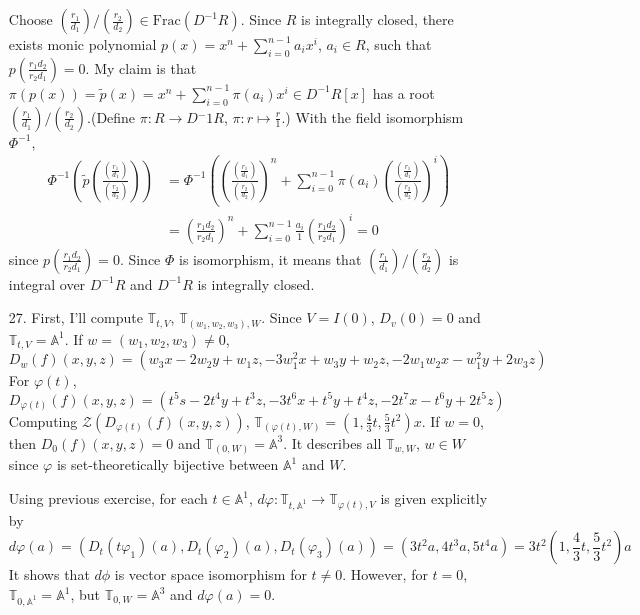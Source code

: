 \documentclass[12pt]{article}
\newcommand{\Z}{\mathcal{Z}}
\begin{document}
\begin{enumerate}
Choose $\left(\frac{r_1}{d_1}\right)/\left(\frac{r_2}{d_2}\right)\in \text{Frac}(D^{-1}R)$. Since $R$ is integrally closed, there exists monic polynomial $p(x)=x^n+\sum\limits_{i=0}^{n-1}a_i x^i$, $a_i\in R$, such that $p\left(\frac{r_1d_2}{r_2d_1}\right)=0$. My claim is that $\pi(p(x))=\tilde{p}(x)=x^n+\sum\limits_{i=0}^{n-1}\pi(a_i) x^i\in D^{-1}R[x]$ has a root $\left(\frac{r_1}{d_1}\right)/\left(\frac{r_2}{d_2}\right)$.(Define $\pi:R\rightarrow D{^-1}R$, $\pi:r\mapsto \frac{r}{1}$.) With the field isomorphism $\Phi^{-1}$,
\begin{equation*}
\begin{split}
\Phi^{-1}\left(\tilde{p}\left(\frac{\left(\frac{r_1}{d_1}\right)}{\left(\frac{r_2}{d_2}\right)}\right)\right)&=\Phi^{-1}\left(\left(\frac{\left(\frac{r_1}{d_1}\right)}{\left(\frac{r_2}{d_2}\right)}\right)^n+\sum\limits_{i=0}^{n-1} \pi(a_i)\left(\frac{\left(\frac{r_1}{d_1}\right)}{\left(\frac{r_2}{d_2}\right)}\right)^{i}\right) \\
&=\left(\frac{r_1d_2}{r_2d_1}\right)^n+\sum\limits_{i=0}^{n-1}\frac{a_i}{1}\left(\frac{r_1d_2}{r_2d_1}\right)^i=0
\end{split}
\end{equation*}
since $p\left(\frac{r_1d_2}{r_2d_1}\right)=0$. Since $\Phi$ is isomorphism, it means that $\left(\frac{r_1}{d_1}\right)/\left(\frac{r_2}{d_2}\right)$ is integral over $D^{-1}R$ and $D^{-1}R$ is integrally closed.
\newpage
\item[27.]
First, I'll compute $\mathbb{T}_{t, V}$, $\mathbb{T}_{(w_1, w_2, w_3), W}$. Since $V=I(0)$, $D_v(0)=0$ and $\mathbb{T}_{t, V}=\mathbb{A}^1$. If $w=(w_1, w_2, w_3)\neq 0$,
\begin{equation*}
D_w(f)(x,y,z)=(w_3 x-2w_2 y+w_1 z,-3w_1^2 x+w_3 y+w_2 z, -2w_1 w_2 x-w_1^2 y+2w_3 z)
\end{equation*}
For $\varphi(t)$,
\begin{equation*}
D_{\varphi(t)}(f)(x,y,z)=(t^5s-2t^4y+t^3z, -3t^6x+t^5y+t^4z, -2t^7x-t^6y+2t^5z)
\end{equation*}
Computing $\Z\left(D_{\varphi(t)}(f)(x,y,z)\right)$, $\mathbb{T}_{(\varphi(t), W)}= \left(1, \frac{4}{3}t, \frac{5}{3}t^2\right)x$.
If $w=0$, then $D_0(f)(x,y,z)=0$ and $\mathbb{T}_{(0, W)}=\mathbb{A}^3$. It describes all $\mathbb{T}_{w, W}$, $w\in W$ since $\varphi$ is set-theoretically bijective between $\mathbb{A}^1$ and $W$.

Using previous exercise, for each $t\in \mathbb{A}^1$, $d\varphi:\mathbb{T}_{t, \mathbb{A}^1}\rightarrow \mathbb{T}_{\varphi(t),V}$ is given explicitly by
\begin{equation*}
d\varphi(a)=(D_t(t\varphi_1)(a), D_t(\varphi_2)(a), D_t(\varphi_3)(a))=(3t^2a, 4t^3a, 5t^4a)=3t^2\left(1, \frac{4}{3}t, \frac{5}{3}t^2\right)a
\end{equation*}
It shows that $d\phi$ is vector space isomorphism for $t\neq 0$. However, for $t=0$, $\mathbb{T}_{0, \mathbb{A}^1}=\mathbb{A}^1$, but $\mathbb{T}_{0, W}=\mathbb{A}^3$ and $d\varphi(a)=0$.


\end{enumerate}
\end{document}
